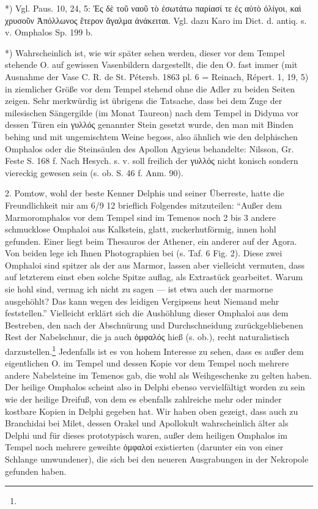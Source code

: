 \documentclass[a4paper, 11pt, oneside]{article}
\begin{document}
*) Vgl. Paus. 10, 24, 5: Ἐς δὲ τοῦ ναοῦ τὸ ἐσωτάτω παρίασί τε ἐς αὐτὸ ὀλίγοι, καὶ χρυσοῦν Ἀπόλλωνος ἕτερον ἄγαλμα ἀνάκειται. Vgl. dazu Karo im Dict. d. antiq. s. v. Omphalos Sp. 199 b.

*) Wahrscheinlich ist, wie wir später sehen werden, dieser vor dem Tempel stehende O. auf gewissen Vasenbildern dargestellt, die den O. fast immer (mit Ausnahme der Vase C. R. de St. Pétersb. 1863 pl. 6 = Reinach, Répert. 1, 19, 5) in ziemlicher Größe vor dem Tempel stehend ohne die Adler zu beiden Seiten zeigen. Sehr merkwürdig ist übrigens die Tatsache, dass bei dem Zuge der milesischen Sängergilde (im Monat Taureon) nach dem Tempel in Didyma vor dessen Türen ein γυλλός genannter Stein gesetzt wurde, den man mit Binden behing und mit ungemischtem Weine begoss, also ähnlich wie den delphischen Omphalos oder die Steinsäulen des Apollon Agyieus behandelte: Nilsson, Gr. Feste S. 168 f. Nach Hesych. s. v. soll freilich der γυλλός nicht konisch sondern viereckig gewesen sein (s. ob. S. 46 f. Anm. 90).

2. Pomtow, wohl der beste Kenner Delphis und seiner Überreste, hatte die Freundlichkeit mir am 6/9 12 brieflich Folgendes mitzuteilen: "`Außer dem Marmoromphalos vor dem Tempel sind im Temenos noch 2 bis 3 andere schmucklose Omphaloi aus Kalkstein, glatt, zuckerhutförmig, innen hohl gefunden. Einer liegt beim Thesauros der Athener, ein anderer auf der Agora. Von beiden lege ich Ihnen Photographien bei (s. Taf. 6 Fig. 2). Diese zwei Omphaloi sind spitzer als der aus Marmor, lassen aber vielleicht vermuten, dass auf letzterem einst eben solche Spitze auflag, als Extrastück gearbeitet. Warum sie hohl sind, vermag ich nicht zu sagen --- ist etwa auch der marmorne ausgehöhlt? Das kann wegen des leidigen Vergipsens heut Niemand mehr feststellen."' Vielleicht erklärt sich die Aushöhlung dieser Omphaloi aus dem Bestreben, den nach der Abschnürung und Durchschneidung zurückgebliebenen Rest der Nabelschnur, die ja auch ὀμφαλός hieß (s. ob.), recht naturalistisch darzustellen.\footnote{} Jedenfalls ist es von hohem Interesse zu sehen, dass es außer dem eigentlichen O. im Tempel und dessen Kopie vor dem Tempel noch mehrere andere Nabelsteine im Temenos gab, die wohl als Weihgeschenke zu gelten haben. Der heilige Omphalos scheint also in Delphi ebenso vervielfältigt worden zu sein wie der heilige Dreifuß, von dem es ebenfalls zahlreiche mehr oder minder kostbare Kopien in Delphi gegeben hat. Wir haben oben gezeigt, dass auch zu Branchidai bei Milet, dessen Orakel und Apollokult wahrscheinlich älter als Delphi und für dieses prototypisch waren, außer dem heiligen Omphalos im Tempel noch mehrere geweihte ὀμφαλοί existierten (darunter ein von einer Schlange umwundener), die sich bei den neueren Ausgrabungen in der Nekropole gefunden haben.
\end{document}
